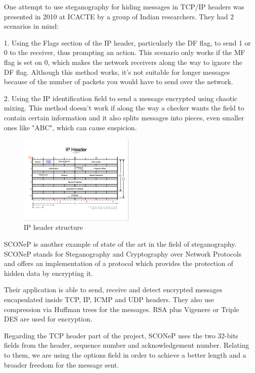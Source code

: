 
One attempt to use steganography for hiding messages in TCP/IP headers was
presented in 2010 at ICACTE by a group of Indian researchers. They had 2
scenarios in mind:

1. Using the Flags section of the IP header, particularly the DF flag, to send
1 or 0 to the receiver, thus prompting an action. This scenario only works if
the MF flag is set on 0, which makes the network receivers along the way to
ignore the DF flag. Although this method works, it's not suitable for longer
messages because of the number of packets you would have to send over the
network.

2. Using the IP identification field to send a message encrypted using chaotic
mixing. This method doesn't work if along the way a checker wants the field to
contain certain information and it also splits messages into pieces, even
smaller ones like "ABC", which can cause suspicion.

\begin{figure}
  \centering
  \includegraphics[width=0.5\textwidth]{img/IPHeader}
  \caption{IP header structure}
  \label{fig:related}
\end{figure}

SCONeP\cite{ciobanu2011sconep} is another example of state of the art in the
field of steganography. SCONeP stands for Steganography and Cryptography over
Network Protocols and offers an implementation of a protocol which provides
the protection of hidden data by encrypting it.

Their application is able to send, receive and detect encrypted messages
encapsulated inside TCP, IP, ICMP and UDP headers. They also use compression
via Huffman trees for the messages. RSA plus Vigenere or Triple DES are used
for encryption.

Regarding the TCP header part of the project, SCONeP uses the two 32-bits
fields from the header, sequence number and acknowledgement number. Relating
to them, we are using the options field in order to achieve a better length
and a broader freedom for the message sent.
